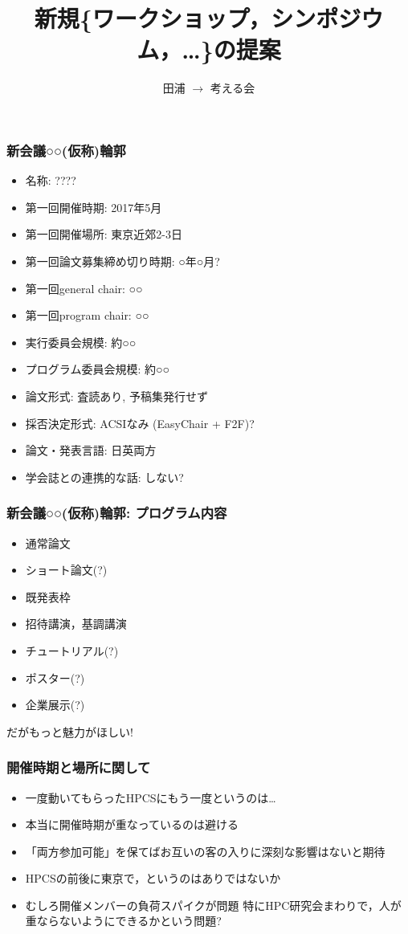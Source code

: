 \documentclass[12pt,dvipdfmx]{beamer}
\title{新規\{ワークショップ，シンポジウム，\ldots\}\confname の提案}
\institute{}
\author{田浦 $\rightarrow$ 考える会}
\date{}
\newcommand{\confname}{{○○(仮称)}}
\newcommand{\firstconfdate}{\ao{2017年5月}}
\newcommand{\firstconfplace}{\ao{東京近郊}}
\newcommand{\firstdeadline}{\ao{○年○月}}
\newcommand{\firstgeneralchair}{\ao{○○}}
\newcommand{\firstprogramchair}{\ao{○○}}
\newcommand{\sizeoc}{\ao{○○}}
\newcommand{\sizepc}{\ao{○○}}
\newcommand{\ao}[1]{{\color{blue}#1}}
\begin{document}
\maketitle

\begin{frame}
\frametitle{新会議\confname 輪郭}
\begin{itemize}
\item 名称: ????
\item 第一回開催時期: \firstconfdate 
\item 第一回開催場所: \firstconfplace 2-3日
\item 第一回論文募集締め切り時期: \firstdeadline ?
\item 第一回general chair: \firstgeneralchair
\item 第一回program chair: \firstprogramchair
\item 実行委員会規模: 約\sizeoc 
\item プログラム委員会規模: 約\sizepc
\item 論文形式: \ao{査読あり, 予稿集発行せず}
\item 採否決定形式: \ao{ACSIなみ (EasyChair + F2F)?}
\item 論文・発表言語: \ao{日英両方}
\item 学会誌との連携的な話: \ao{しない?}
\end{itemize}
\end{frame}

\begin{frame}
\frametitle{新会議\confname 輪郭: プログラム内容}
\begin{itemize}
\item 通常論文
\item ショート論文(?)
\item 既発表枠
\item 招待講演，基調講演
\item チュートリアル(?)
\item ポスター(?)
\item 企業展示(?)
\end{itemize}

\begin{center}
\ao{\huge だがもっと魅力がほしい!}
\end{center}

\end{frame}

\begin{frame}
\frametitle{開催時期と場所に関して}

\begin{itemize}
\item 一度動いてもらったHPCSにもう一度というのは\ldots
\item 本当に開催時期が重なっているのは避ける
\item 「両方参加可能」を保てばお互いの客の入りに深刻な影響はないと期待
\item HPCSの前後に東京で，というのはありではないか
\item むしろ開催メンバーの負荷スパイクが問題
  特にHPC研究会まわりで，人が重ならないようにできるかという問題?
\end{itemize}
\end{frame}
\end{document}
